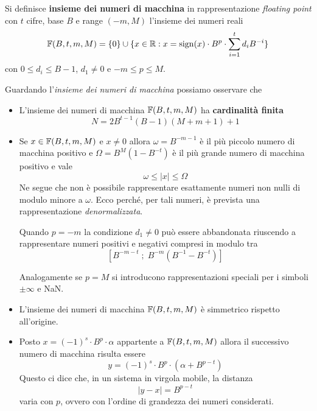 \begin{definition}\label{set_num_macchina}
	Si definisce \textbf{insieme dei numeri di macchina} in rappresentazione \emph{floating point} con $t$
	cifre, base $B$ e range $(-m, M)$ l'insieme dei numeri reali
	\[
		\mathbb{F} (B, t, m, M) = \{ 0 \} \cup
		\{ x \in \mathbb{R} : x = \operatorname{sign}(x) \cdot B^p \cdot \sum_{i=1}^t d_i B^{-i} \}
	\]
	con $0 \leq d_i \leq B-1$, $d_1 \neq 0$ e $-m \leq p \leq M$.
\end{definition}

\begin{observation}
	Guardando l'\emph{insieme dei numeri di macchina} possiamo osservare che
	\begin{itemize}
		\item L'insieme dei numeri di macchina $\mathbb{F}(B, t, m, M)$ ha \textbf{cardinalità finita}
		      \[ N = 2 B^{t-1} (B - 1) (M + m + 1) + 1 \]
		\item Se $x \in \mathbb{F}(B, t, m, M)$ e $x \neq 0$ allora $\omega = B^{-m - 1}$ è il più piccolo numero di
		      macchina positivo e $\Omega = B^M (1 - B^{-t})$ è il più grande numero di macchina positivo e
		      vale
		      \[ \omega \leq |x| \leq \Omega \]
		      Ne segue che non è possibile rappresentare esattamente numeri non nulli di modulo minore a
		      $\omega$. Ecco perché, per tali numeri, è prevista una rappresentazione \emph{denormalizzata}.

		      Quando $p = -m$ la condizione $d_1 \neq 0$ può essere abbandonata riuscendo a rappresentare
		      numeri positivi e negativi compresi in modulo tra
		      \[ [ B^{-m-t} \;;\; B^{-m} (B^{-1} - B^{-t}) ] \]

		      Analogamente se $p = M$ si introducono rappresentazioni speciali per i simboli $\pm \infty$
		      e NaN.
		\item L'insieme dei numeri di macchina $\mathbb{F} (B, t, m, M)$ è simmetrico rispetto all'origine.
		\item Posto $x = (-1)^s \cdot B^p \cdot \alpha$ appartente a $\mathbb{F}(B, t, m, M)$ allora il
		      successivo numero di macchina risulta essere
		      \[ y = (-1)^s \cdot B^p \cdot (\alpha + B^{p-t}) \]
		      Questo ci dice che, in un sistema in virgola mobile, la distanza
		      \[ |y - x| = B^{p-t} \]
		      varia con $p$, ovvero con l'ordine di grandezza dei numeri considerati.
	\end{itemize}
\end{observation}
